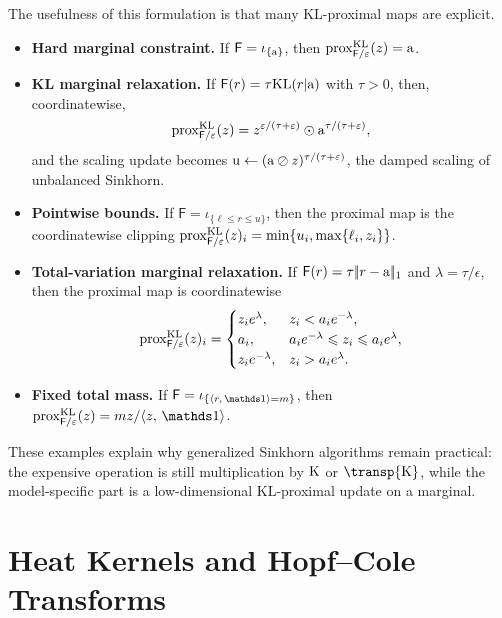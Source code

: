 The usefulness of this formulation is that many KL-proximal maps are explicit.
\begin{itemize}
	\item \textbf{Hard marginal constraint.} If $\mathsf F=\iota_{\{\mathrm{a}\}}$, then $\operatorname{prox}_{\mathsf F/\varepsilon}^{\mathrm{KL}}(z)=\mathrm{a}$.
	\item \textbf{KL marginal relaxation.} If $\mathsf F(r)=\tau\mathrm{KL}(r|\mathrm{a})$ with $\tau>0$, then, coordinatewise,
	\[
		\operatorname{prox}_{\mathsf F/\varepsilon}^{\mathrm{KL}}(z)
		=
		z^{\varepsilon/(\tau+\varepsilon)}\odot \mathrm{a}^{\tau/(\tau+\varepsilon)},
	\]
	and the scaling update becomes $\mathrm{u}\leftarrow(\mathrm{a}\oslash z)^{\tau/(\tau+\varepsilon)}$, the damped scaling of unbalanced Sinkhorn.
	\item \textbf{Pointwise bounds.} If $\mathsf F=\iota_{\{\ell\leq r\leq u\}}$, then the proximal map is the coordinatewise clipping $\operatorname{prox}_{\mathsf F/\varepsilon}^{\mathrm{KL}}(z)_i=\min\{u_i,\max\{\ell_i,z_i\}\}$.
	\item \textbf{Total-variation marginal relaxation.} If $\mathsf F(r)=\tau|\!| r-\mathrm{a} |\!|_1$ and $\lambda=\tau/\epsilon$, then the proximal map is coordinatewise
	\[
		\operatorname{prox}_{\mathsf F/\varepsilon}^{\mathrm{KL}}(z)_i
		=
		\begin{cases}
		z_i e^{\lambda}, & z_i<a_i e^{-\lambda},\\
		a_i, & a_i e^{-\lambda}\leqslant z_i\leqslant a_i e^{\lambda},\\
		z_i e^{-\lambda}, & z_i>a_i e^{\lambda}.
		\end{cases}
	\]
	\item \textbf{Fixed total mass.} If $\mathsf F=\iota_{\{\dotp{r}{\ones}=m\}}$, then $\prox_{\mathsf F/\epsilon}^{\KLD}(z)=m z/\dotp{z}{\ones}$.
\end{itemize}
These examples explain why generalized Sinkhorn algorithms remain practical: the expensive operation is still multiplication by $\mathrm{K}$ or $\transp{\K}$, while the model-specific part is a low-dimensional KL-proximal update on a marginal.

\section{Heat Kernels and Hopf--Cole Transforms}
\label{sec-sinkhorn-heat-hopf-cole}

